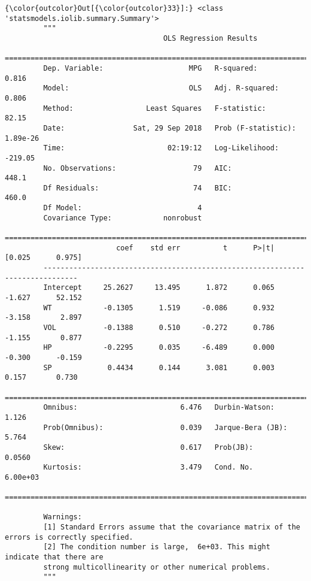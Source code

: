 \documentclass[11pt]{article}
\begin{document}
\begin{Verbatim}[commandchars=\\\{\}]
{\color{outcolor}Out[{\color{outcolor}33}]:} <class 'statsmodels.iolib.summary.Summary'>
         """
                                     OLS Regression Results                            
         ==============================================================================
         Dep. Variable:                    MPG   R-squared:                       0.816
         Model:                            OLS   Adj. R-squared:                  0.806
         Method:                 Least Squares   F-statistic:                     82.15
         Date:                Sat, 29 Sep 2018   Prob (F-statistic):           1.89e-26
         Time:                        02:19:12   Log-Likelihood:                -219.05
         No. Observations:                  79   AIC:                             448.1
         Df Residuals:                      74   BIC:                             460.0
         Df Model:                           4                                         
         Covariance Type:            nonrobust                                         
         ==============================================================================
                          coef    std err          t      P>|t|      [0.025      0.975]
         ------------------------------------------------------------------------------
         Intercept     25.2627     13.495      1.872      0.065      -1.627      52.152
         WT            -0.1305      1.519     -0.086      0.932      -3.158       2.897
         VOL           -0.1388      0.510     -0.272      0.786      -1.155       0.877
         HP            -0.2295      0.035     -6.489      0.000      -0.300      -0.159
         SP             0.4434      0.144      3.081      0.003       0.157       0.730
         ==============================================================================
         Omnibus:                        6.476   Durbin-Watson:                   1.126
         Prob(Omnibus):                  0.039   Jarque-Bera (JB):                5.764
         Skew:                           0.617   Prob(JB):                       0.0560
         Kurtosis:                       3.479   Cond. No.                     6.00e+03
         ==============================================================================
         
         Warnings:
         [1] Standard Errors assume that the covariance matrix of the errors is correctly specified.
         [2] The condition number is large,  6e+03. This might indicate that there are
         strong multicollinearity or other numerical problems.
         """
\end{Verbatim}
            
\end{document}
